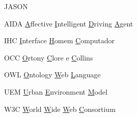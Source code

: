 \begin{listofabbrv}{JASON}
        \item[AIDA] \underline{A}ffective \underline{I}ntelligent \underline{D}riving \underline{A}gent
        \item[IHC] \underline{I}nterface \underline{H}omem \underline{C}omputador
        \item[OCC] \underline{O}rtony \underline{C}lore e \underline{C}ollins
        \item[OWL] \underline{O}ntology \underline{W}eb \underline{L}anguage
		\item[UEM] \underline{U}rban \underline{E}nvironment \underline{M}odel
        \item[W3C] \underline{W}orld \underline{W}ide \underline{W}eb \underline{C}onsortium
\end{listofabbrv}
